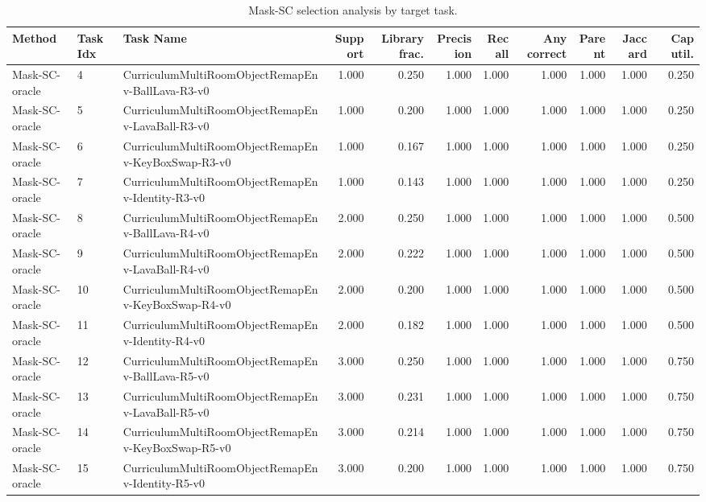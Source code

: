 \begin{table}[ht]
    \caption{Mask-SC selection analysis by target task.}
    \label{tbl:masksc_selection_task}
    \centering
    \scriptsize
    \begin{tabular}{lllrrrrrrrr}
    \toprule
Method & Task Idx & Task Name & Support & Library frac. & Precision & Recall & Any correct & Parent & Jaccard & Cap util. \\
    \midrule
Mask-SC-oracle & 4 & CurriculumMultiRoomObjectRemapEnv-BallLava-R3-v0 & 1.000 & 0.250 & 1.000 & 1.000 & 1.000 & 1.000 & 1.000 & 0.250 \\
Mask-SC-oracle & 5 & CurriculumMultiRoomObjectRemapEnv-LavaBall-R3-v0 & 1.000 & 0.200 & 1.000 & 1.000 & 1.000 & 1.000 & 1.000 & 0.250 \\
Mask-SC-oracle & 6 & CurriculumMultiRoomObjectRemapEnv-KeyBoxSwap-R3-v0 & 1.000 & 0.167 & 1.000 & 1.000 & 1.000 & 1.000 & 1.000 & 0.250 \\
Mask-SC-oracle & 7 & CurriculumMultiRoomObjectRemapEnv-Identity-R3-v0 & 1.000 & 0.143 & 1.000 & 1.000 & 1.000 & 1.000 & 1.000 & 0.250 \\
Mask-SC-oracle & 8 & CurriculumMultiRoomObjectRemapEnv-BallLava-R4-v0 & 2.000 & 0.250 & 1.000 & 1.000 & 1.000 & 1.000 & 1.000 & 0.500 \\
Mask-SC-oracle & 9 & CurriculumMultiRoomObjectRemapEnv-LavaBall-R4-v0 & 2.000 & 0.222 & 1.000 & 1.000 & 1.000 & 1.000 & 1.000 & 0.500 \\
Mask-SC-oracle & 10 & CurriculumMultiRoomObjectRemapEnv-KeyBoxSwap-R4-v0 & 2.000 & 0.200 & 1.000 & 1.000 & 1.000 & 1.000 & 1.000 & 0.500 \\
Mask-SC-oracle & 11 & CurriculumMultiRoomObjectRemapEnv-Identity-R4-v0 & 2.000 & 0.182 & 1.000 & 1.000 & 1.000 & 1.000 & 1.000 & 0.500 \\
Mask-SC-oracle & 12 & CurriculumMultiRoomObjectRemapEnv-BallLava-R5-v0 & 3.000 & 0.250 & 1.000 & 1.000 & 1.000 & 1.000 & 1.000 & 0.750 \\
Mask-SC-oracle & 13 & CurriculumMultiRoomObjectRemapEnv-LavaBall-R5-v0 & 3.000 & 0.231 & 1.000 & 1.000 & 1.000 & 1.000 & 1.000 & 0.750 \\
Mask-SC-oracle & 14 & CurriculumMultiRoomObjectRemapEnv-KeyBoxSwap-R5-v0 & 3.000 & 0.214 & 1.000 & 1.000 & 1.000 & 1.000 & 1.000 & 0.750 \\
Mask-SC-oracle & 15 & CurriculumMultiRoomObjectRemapEnv-Identity-R5-v0 & 3.000 & 0.200 & 1.000 & 1.000 & 1.000 & 1.000 & 1.000 & 0.750 \\
    \bottomrule
    \end{tabular}
\end{table}
